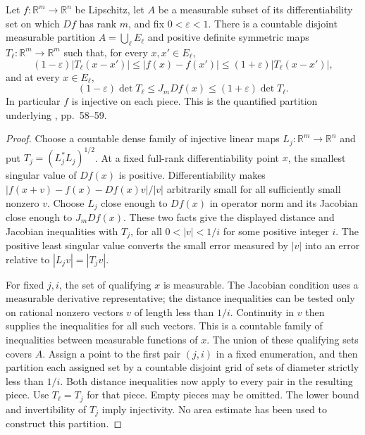 \begin{proposition}\label{prop:area-full-rank-metric-pieces}
Let $f:\mathbb R^m\to\mathbb R^n$ be Lipschitz, let $A$ be a measurable subset of its differentiability set on which $Df$ has rank $m$, and fix $0<\varepsilon<1$. There is a countable disjoint measurable partition $A=\bigcup_\ell E_\ell$ and positive definite symmetric maps $T_\ell:\mathbb R^m\to\mathbb R^m$ such that, for every $x,x'\in E_\ell$,
\[
 (1-\varepsilon)|T_\ell(x-x')|
 \leq |f(x)-f(x')|
 \leq(1+\varepsilon)|T_\ell(x-x')|,
\]
and at every $x\in E_\ell$,
\[
 (1-\varepsilon)\det T_\ell\leq J_mDf(x)
 \leq(1+\varepsilon)\det T_\ell.
\]
In particular $f$ is injective on each piece. This is the quantified partition underlying \cite{Sim18}, pp.~58--59.
\end{proposition}
\begin{proof}
Choose a countable dense family of injective linear maps $L_j:\mathbb R^m\to\mathbb R^n$ and put $T_j=(L_j^*L_j)^{1/2}$. At a fixed full-rank differentiability point $x$, the smallest singular value of $Df(x)$ is positive. Differentiability makes $|f(x+v)-f(x)-Df(x)v|/|v|$ arbitrarily small for all sufficiently small nonzero $v$. Choose $L_j$ close enough to $Df(x)$ in operator norm and its Jacobian close enough to $J_mDf(x)$. These two facts give the displayed distance and Jacobian inequalities with $T_j$, for all $0<|v|<1/i$ for some positive integer $i$. The positive least singular value converts the small error measured by $|v|$ into an error relative to $|L_jv|=|T_jv|$.

For fixed $j,i$, the set of qualifying $x$ is measurable. The Jacobian condition uses a measurable derivative representative; the distance inequalities can be tested only on rational nonzero vectors $v$ of length less than $1/i$. Continuity in $v$ then supplies the inequalities for all such vectors. This is a countable family of inequalities between measurable functions of $x$. The union of these qualifying sets covers $A$. Assign a point to the first pair $(j,i)$ in a fixed enumeration, and then partition each assigned set by a countable disjoint grid of sets of diameter strictly less than $1/i$. Both distance inequalities now apply to every pair in the resulting piece. Use $T_\ell=T_j$ for that piece. Empty pieces may be omitted. The lower bound and invertibility of $T_j$ imply injectivity. No area estimate has been used to construct this partition.
\end{proof}

